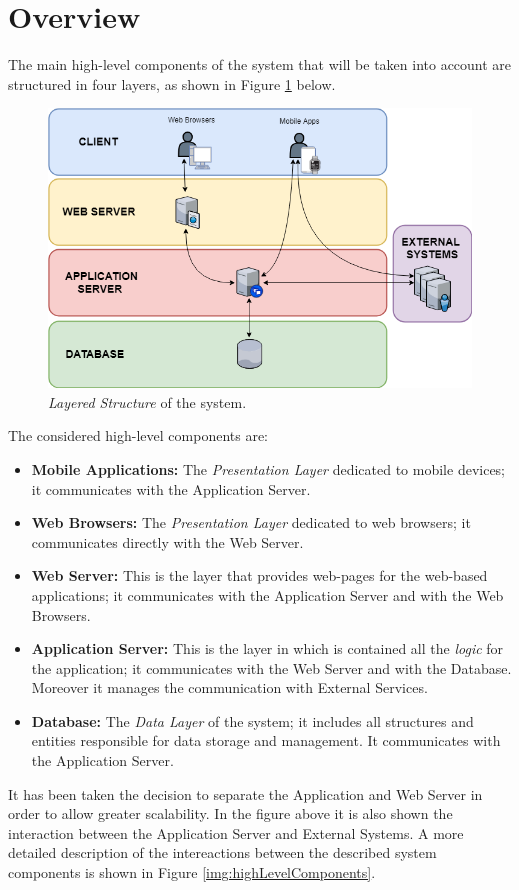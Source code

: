  \section{Overview}
The main high-level components of the system that will be taken into account are structured in four layers, as shown in Figure \ref{img:layeredStructure} below.

\begin{figure}[H]
  \begin{center}
  	\includegraphics[width=\textwidth]{./img/LayeredStructure.png}
    \hspace{0.05\linewidth}
    \centering
    \caption{\textit{Layered Structure} of the system.}
		\label{img:layeredStructure}
    \end{center}
\end{figure}

The considered high-level components are:
\begin{itemize}
  \setlength{\itemindent}{-.4in}
  \item[] \textbf{Mobile Applications:} The \textit{Presentation Layer} dedicated to mobile devices; it communicates with the Application Server.
  \item[] \textbf{Web Browsers:} The \textit{Presentation Layer} dedicated to web browsers; it communicates directly with the Web Server.
  \item[] \textbf{Web Server:} This is the layer that provides web-pages for the web-based applications; it communicates with the Application Server and with the Web Browsers.
  \item[] \textbf{Application Server:} This is the layer in which is contained all the \textit{logic} for the application; it communicates with the Web Server and with the Database. Moreover it manages the communication with External Services.
  \item[] \textbf{Database:}  The \textit{Data Layer} of the system; it includes all structures and entities responsible for data storage and management. It communicates with the Application Server.
\end{itemize}
It has been taken the decision to separate the Application and Web Server in order to allow greater scalability. In the figure above it is also shown the interaction between the Application Server and External Systems.
A more detailed description of the intereactions between the described system components is shown in Figure \ref{img:highLevelComponents}.

